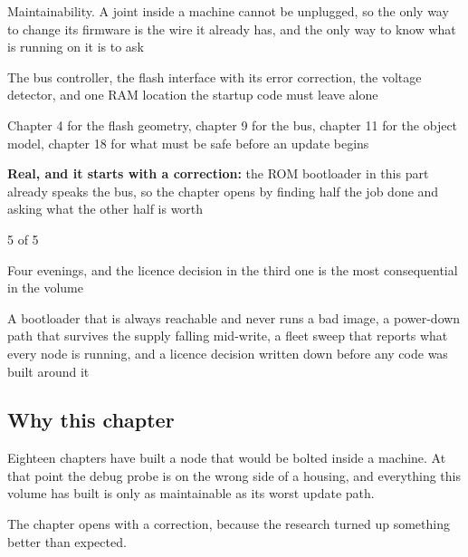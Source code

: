 
\begin{keyfacts}
\item[Adds to the node] Maintainability. A joint inside a machine cannot be
unplugged, so the only way to change its firmware is the wire it already has,
and the only way to know what is running on it is to ask
\item[Peripherals] The bus controller, the flash interface with its error
correction, the voltage detector, and one RAM location the startup code must
leave alone
\item[Depends on] Chapter 4 for the flash geometry, chapter 9 for the bus,
chapter 11 for the object model, chapter 18 for what must be safe before an
update begins
\item[Real or modelled] \textbf{Real, and it starts with a correction:} the
ROM bootloader in this part already speaks the bus, so the chapter opens by
finding half the job done and asking what the other half is worth
\item[Difficulty] 5 of 5
\item[Effort] Four evenings, and the licence decision in the third one is the
most consequential in the volume
\item[Deliverable] A bootloader that is always reachable and never runs a bad
image, a power-down path that survives the supply falling mid-write, a fleet
sweep that reports what every node is running, and a licence decision written
down before any code was built around it
\end{keyfacts}

\subsection*{Why this chapter}

Eighteen chapters have built a node that would be bolted inside a machine. At
that point the debug probe is on the wrong side of a housing, and everything
this volume has built is only as maintainable as its worst update path.

The chapter opens with a correction, because the research turned up something
better than expected.

